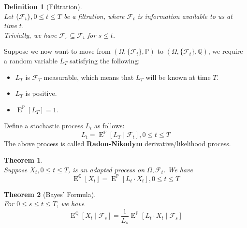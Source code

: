\documentclass[12pt]{article}
\newtheorem{definition}{Definition}[section]
\newtheorem{theorem}{Theorem}[section]
\theoremstyle{definition}
\DeclareMathOperator{\expec}{E}
\begin{document}
\begin{definition}[Filtration]
\hfill\\\normalfont Let $\{\mathcal{F}_t\}, 0\leq t\leq T$ be a filtration, where $\mathcal{F}_t$ is information available to us at time $t$.\\
Trivially, we have $\mathcal{F}_s\subseteq \mathcal{F}_t$ for $s\leq t$.
\end{definition}
Suppose we now want to move from $(\Omega, \{\mathcal{F}_t\}, \mathbb{P})$ to $(\Omega, \{\mathcal{F}_t\}, \mathbb{Q})$, we require a random variable $L_T$ satisfying the following:
\begin{itemize}
  \item $L_T$ is $\mathcal{F}_T$ measurable, which means that $L_T$ will be known at time $T$.
  \item $L_T$ is positive.
  \item $\expec^\mathbb{P}[L_T]=1$.
\end{itemize}
Define a stochastic process $L_t$ as follows:
\[
L_t=\expec^\mathbb{P}[L_T\mid \mathcal{F}_t], 0\leq t\leq T
\]
The above process is called \textbf{Radon-Nikodym} derivative/likelihood process.
\begin{theorem}
\hfill\\\normalfont Suppose $X_t,0\leq t\leq T$, is an adapted process on $\Omega, \mathcal{F}_t$. We have
\[
\expec^\mathbb{Q}[X_t]=\expec^\mathbb{P}[L_t\cdot X_t], 0\leq t\leq T
\]
\end{theorem}
\begin{theorem}[Bayes' Formula]
\hfill\\\normalfont For $0\leq s\leq t\leq T$, we have
\[
\expec^\mathbb{Q}[X_t\mid \mathcal{F}_s]=\frac{1}{L_s}\expec^\mathbb{P}[L_t\cdot X_t\mid \mathcal{F}_s]
\]
\end{theorem}
\end{document}
